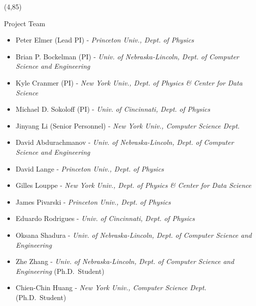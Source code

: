 \documentclass[final]{beamer}
\begin{document}
\begin{frame}{}







\begin{textblock}{38.0}(4,85)
\begin{block}{Project Team}
\begin{itemize}
\item Peter Elmer (Lead PI) - {\it Princeton Univ., Dept. of Physics}
\item Brian P. Bockelman (PI) - {\it Univ. of Nebraska-Lincoln, Dept. of Computer Science and Engineering}
\item Kyle Cranmer (PI) - {\it New York Univ., Dept. of Physics \& Center for Data Science}
\item Michael D. Sokoloff (PI) - {\it Univ. of Cincinnati, Dept. of Physics}
\item Jinyang Li (Senior Personnel) - {\it New York Univ., Computer Science Dept.}
\item David Abdurachmanov - {\it Univ. of Nebraska-Lincoln, Dept. of Computer Science and Engineering}
\item David Lange - {\it Princeton Univ., Dept. of Physics}
\item Gilles Louppe - {\it New York Univ., Dept. of Physics \& Center for Data Science}
\item James Pivarski - {\it Princeton Univ., Dept. of Physics}
\item Eduardo Rodrigues - {\it Univ. of Cincinnati, Dept. of Physics}
\item Oksana Shadura - {\it Univ. of Nebraska-Lincoln, Dept. of Computer Science and Engineering}
\item Zhe Zhang - {\it Univ. of Nebraska-Lincoln, Dept. of Computer Science and Engineering} (Ph.D.\ Student)
\item Chien-Chin Huang - {\it New York Univ., Computer Science Dept.} (Ph.D.\ Student) 
\end{itemize}
\end{block}
\end{textblock}


\end{frame}
\end{document}
